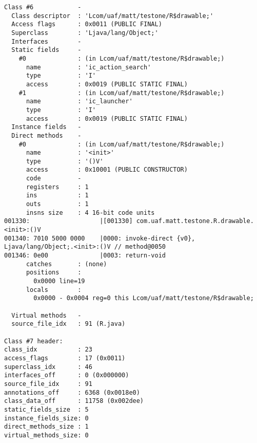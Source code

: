 \begin{lstlisting}
Class #6            -
  Class descriptor  : 'Lcom/uaf/matt/testone/R$drawable;'
  Access flags      : 0x0011 (PUBLIC FINAL)
  Superclass        : 'Ljava/lang/Object;'
  Interfaces        -
  Static fields     -
    #0              : (in Lcom/uaf/matt/testone/R$drawable;)
      name          : 'ic_action_search'
      type          : 'I'
      access        : 0x0019 (PUBLIC STATIC FINAL)
    #1              : (in Lcom/uaf/matt/testone/R$drawable;)
      name          : 'ic_launcher'
      type          : 'I'
      access        : 0x0019 (PUBLIC STATIC FINAL)
  Instance fields   -
  Direct methods    -
    #0              : (in Lcom/uaf/matt/testone/R$drawable;)
      name          : '<init>'
      type          : '()V'
      access        : 0x10001 (PUBLIC CONSTRUCTOR)
      code          -
      registers     : 1
      ins           : 1
      outs          : 1
      insns size    : 4 16-bit code units
001330:                   |[001330] com.uaf.matt.testone.R.drawable.<init>:()V
001340: 7010 5000 0000    |0000: invoke-direct {v0}, Ljava/lang/Object;.<init>:()V // method@0050
001346: 0e00              |0003: return-void
      catches       : (none)
      positions     :
        0x0000 line=19
      locals        :
        0x0000 - 0x0004 reg=0 this Lcom/uaf/matt/testone/R$drawable;

  Virtual methods   -
  source_file_idx   : 91 (R.java)

Class #7 header:
class_idx           : 23
access_flags        : 17 (0x0011)
superclass_idx      : 46
interfaces_off      : 0 (0x000000)
source_file_idx     : 91
annotations_off     : 6368 (0x0018e0)
class_data_off      : 11758 (0x002dee)
static_fields_size  : 5
instance_fields_size: 0
direct_methods_size : 1
virtual_methods_size: 0


\end{lstlisting}
